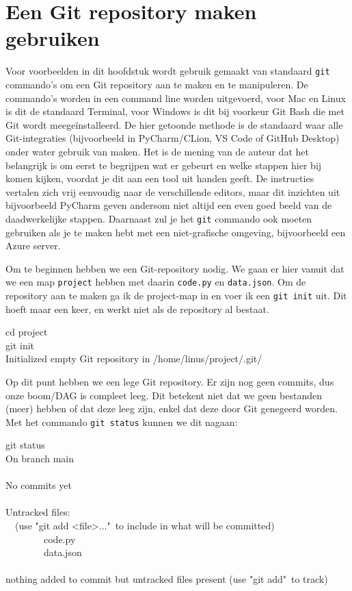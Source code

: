 \section{Een Git repository maken gebruiken}

\begin{remark}
Voor voorbeelden in dit hoofdstuk wordt gebruik gemaakt van standaard \texttt{git} commando's om een Git repository aan te maken en te manipuleren. De commando's worden in een command line worden uitgevoerd, voor Mac en Linux is dit de standaard Terminal, voor Windows is dit bij voorkeur Git Bash die met Git wordt meege\"installeerd. De hier getoonde methode is de standaard waar alle Git-integraties (bijvoorbeeld in PyCharm/CLion, VS Code of GitHub Desktop) onder water gebruik van maken. Het is de mening van de auteur dat het belangrijk is om eerst te begrijpen wat er gebeurt en welke stappen hier bij komen kijken, voordat je dit aan een tool uit handen geeft. De instructies vertalen zich vrij eenvoudig naar de verschillende editors, maar dit inzichten uit bijvoorbeeld PyCharm geven andersom niet altijd een even goed beeld van de daadwerkelijke stappen. Daarnaast zul je het \texttt{git} commando ook moeten gebruiken als je te maken hebt met een niet-grafische omgeving, bijvoorbeeld een Azure server. 
\end{remark}

Om te beginnen hebben we een Git-repository nodig. We gaan er hier vanuit dat we een map \texttt{project} hebben met daarin \texttt{code.py} en \texttt{data.json}. Om de repository aan te maken ga ik de project-map in en voer ik een \texttt{git init} uit. Dit hoeft maar een keer, en werkt niet als de repository al bestaat.

\begin{bash}
\userprompt cd project\\
 git init\\
Initialized empty Git repository in /home/linus/project/.git/
\end{bash}

Op dit punt hebben we een lege Git repository. Er zijn nog geen commits, dus onze boom/DAG is compleet leeg. Dit betekent niet dat we geen bestanden (meer) hebben of dat deze leeg zijn, enkel dat deze door Git genegeerd worden. Met het commando \texttt{git status} kunnen we dit nagaan:

\begin{bash}
 git status\\
On branch main\\
~ \\
No commits yet\\
~ \\
Untracked files:\\
\ \ (use "git add <file>..."\ to include in what will be committed)\\
\ \ \ \ \ \ \ \ code.py\\
\ \ \ \ \ \ \ \ data.json\\
~ \\
nothing added to commit but untracked files present (use "git add"\ to track)
\end{bash}

